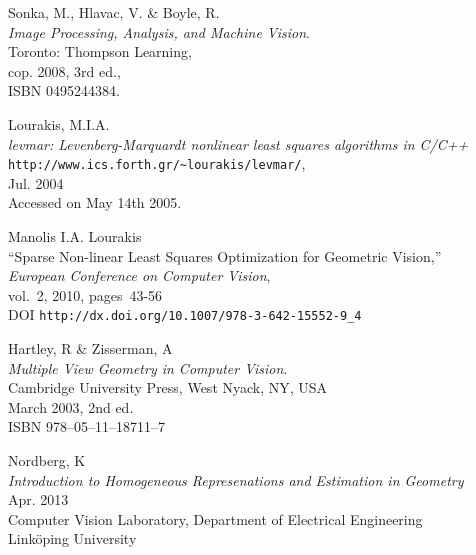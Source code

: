\begin{thebibliography}{9}

	Sonka, M., Hlavac, V. \& Boyle, R. \\
	\emph{Image Processing, Analysis, and Machine Vision}.\\
	Toronto: Thompson Learning,\\
	cop. 2008, 3rd ed.,\\
	ISBN 0495244384.

    Lourakis, M.I.A.\\
   \emph{levmar: Levenberg-Marquardt nonlinear least squares algorithms in {C}/{C}++}\\
     \verb+http://www.ics.forth.gr/~lourakis/levmar/+,\\
    Jul. 2004\\
    Accessed on May 14th 2005.
    
    Manolis I.A. Lourakis\\
   ``Sparse Non-linear Least Squares Optimization for Geometric Vision,''\\
    \emph{European Conference on Computer Vision},\\
    vol.~2, 2010,
    pages~43-56 \\
    DOI \verb+http://dx.doi.org/10.1007/978-3-642-15552-9_4+

	Hartley, R \& Zisserman, A\\
	\emph{Multiple View Geometry in Computer Vision}.\\
	Cambridge University Press, West Nyack, NY, USA \\
	March 2003, 2nd ed.\\
	ISBN 978--05--11--18711--7
	
	Nordberg, K\\
	\emph{Introduction to Homogeneous Represenations and Estimation in Geometry}\\
	Apr. 2013\\
	Computer Vision Laboratory,	Department of Electrical Engineering\\
	Linköping University


	


\end{thebibliography}